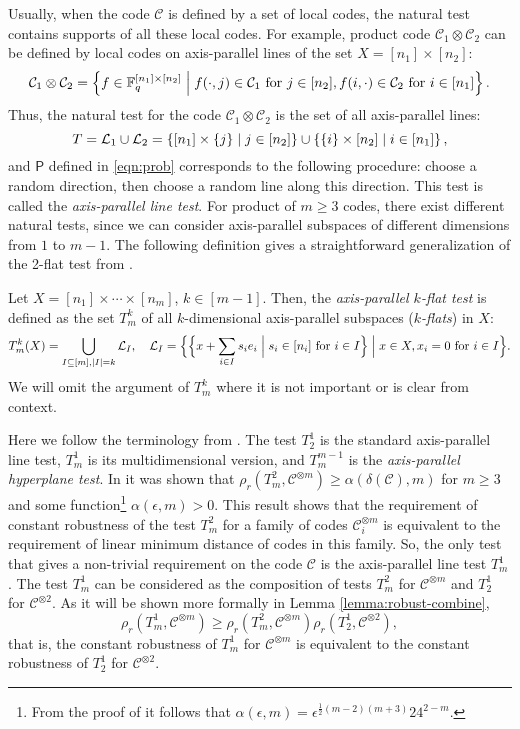 \documentclass[11pt]{article}
\newcommand{\cC}{\mathcal{C}}
\newcommand{\cL}{\mathcal{L}}
\newcommand{\PP}{\mathsf{P}}
\begin{document}
Usually, when the code $\cC$ is defined by a set of local codes, the natural test contains supports of all these local codes. For example, product code $\cC_1\otimes \cC_2$ can be defined by local codes on axis-parallel lines of the set $X=[n_1]\times [n_2]$:
$$\cC_1\otimes \cC_2=\fbr{f\in\F_q^{[n_1]\times [n_2]}\Bigm| f(\cdot, j)\in\cC_1\mbox{ for }j\in [n_2],f(i,\cdot)\in\cC_2\mbox{ for }i\in [n_1]}.$$
Thus, the natural test for the code $\cC_1\otimes \cC_2$ is the set of all axis-parallel lines:
$$T=\cL_1\cup\cL_2 = \fbr{[n_1]\times \{j\}\mid j\in [n_2]}\cup \fbr{\{i\}\times [n_2]\mid i\in[n_1]},$$
and $\PP$ defined in \eqref{eqn:prob} corresponds to the following procedure: choose a random direction, then choose a random line along this direction.
This test is called the \emph{axis-parallel line test}. For product of $m\ge 3$ codes, there exist different natural tests, since we can consider axis-parallel subspaces of different dimensions from $1$ to $m-1$.
The following definition gives a straightforward generalization of the 2-flat test from \cite[Algorithm 12.2]{Lin-func-prop}.
\begin{definition}
    Let $X=[n_1]\times \cdots\times [n_m]$, $k\in [m-1]$. Then, the \emph{axis-parallel $k$-flat test} is defined as the set $T_m^k$ of all $k$-dimensional axis-parallel subspaces (\emph{$k$-flats}) in $X$:
    $$T_m^k(X)=\bigcup_{I\subseteq [m], |I|=k}\cL_I,\quad \cL_I=\Bigfbr{\Bigfbr{x+\sum_{i\in I}s_ie_i\Bigm| s_i\in [n_i]\mbox{ for }i\in I}\Bigm| x\in X, x_i=0\mbox{ for }i\in I}.$$
    We will omit the argument of $T_m^k$ where it is not important or is clear from context.
\end{definition}

Here we follow the terminology from \cite{Lin-func-prop}.
The test $T_2^1$ is the standard axis-parallel line test, $T_m^1$ is its multidimensional version, and $T_m^{m-1}$ is the \emph{axis-parallel hyperplane test}. 
In \cite[Theorem 12.5]{Lin-func-prop} it was shown that $\rho_r(T_m^2, \cC^{\otimes m})\ge \alpha(\delta(\cC),m)$ for $m\ge 3$ and some function\footnote{From the proof of \cite[Theorem 12.5]{Lin-func-prop} it follows that $\alpha(\epsilon, m)=\epsilon^{\frac12(m-2)(m+3)}24^{2-m}$.} $\alpha(\epsilon, m)>0$.
This result shows that the requirement of constant robustness of the test $T_m^2$ for a family of codes $\cC_i^{\otimes m}$ is equivalent to the requirement of linear minimum distance of codes in this family. 
So, the only test that gives a non-trivial requirement on the code $\cC$ is the axis-parallel line test $T_m^1$. 
The test $T_m^1$ can be considered as the composition of tests $T_m^2$ for $\cC^{\otimes m}$ and $T_2^1$ for $\cC^{\otimes 2}$. As it will be shown more formally in Lemma \ref{lemma:robust-combine}, 
\[\rho_r(T_m^1,\cC^{\otimes m})\ge \rho_r(T_m^2,\cC^{\otimes m})\rho_r(T_2^1,\cC^{\otimes 2}),\]
that is, the constant robustness of $T_m^1$ for $\cC^{\otimes m}$ is equivalent to the constant robustness of $T_2^1$ for $\cC^{\otimes 2}$.
\end{document}
